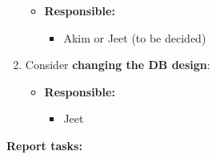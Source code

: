 \documentclass[12pt]{article}
\begin{document}
\begin{enumerate}
  \begin{itemize}
  \tightlist
  \item
    \textbf{Responsible:}

    \begin{itemize}
    \tightlist
    \item
      Akim or Jeet (to be decided)
    \end{itemize}
  \end{itemize}
\item
  Consider \textbf{changing the DB design}:

  \begin{itemize}
  \tightlist
  \item
    \textbf{Responsible:}

    \begin{itemize}
    \tightlist
    \item
      Jeet
    \end{itemize}
  \end{itemize}
\end{enumerate}

\textbf{Report tasks:}
\end{document}
